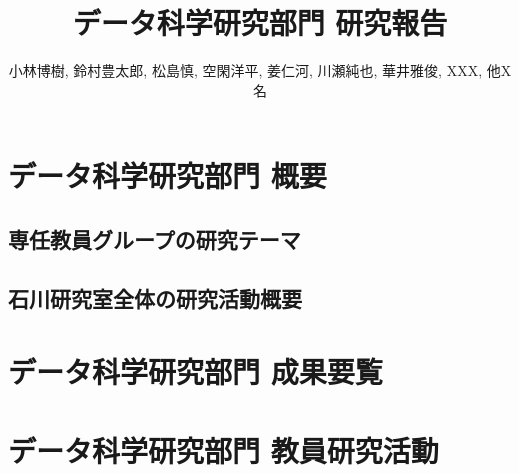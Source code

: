 \documentclass[11pt]{jarticle}
\title{データ科学研究部門 研究報告}
\author{小林博樹, 鈴村豊太郎, 松島慎, 空閑洋平, 姜仁河, 川瀬純也, 華井雅俊, XXX, 他X名}
\begin{document}
\maketitle

\section{データ科学研究部門 概要}



\subsection{専任教員グループの研究テーマ}



\subsection{石川研究室全体の研究活動概要}

\section{データ科学研究部門 成果要覧}


\section{データ科学研究部門 教員研究活動}






















\end{document}
